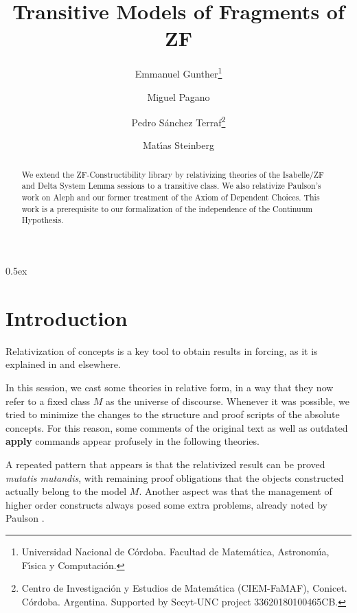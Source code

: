 \documentclass[11pt,a4paper,english]{article}
\begin{document}
\title{Transitive Models of Fragments of ZF}
\author{Emmanuel Gunther\thanks{Universidad Nacional de C\'ordoba.
    Facultad de Matem\'atica, Astronom\'{\i}a,  F\'{\i}sica y
    Computaci\'on.}
  \and
  Miguel Pagano\footnotemark[1]
  \and
  Pedro S\'anchez Terraf\footnotemark[1] \thanks{Centro de Investigaci\'on y Estudios de Matem\'atica
    (CIEM-FaMAF), Conicet. C\'ordoba. Argentina.
    Supported by Secyt-UNC project 33620180100465CB.}
  \and
  Mat\'{\i}as Steinberg\footnotemark[1]
}
\maketitle

\begin{abstract}
  We extend the ZF-Constructibility library by relativizing theories
  of the Isabelle/ZF and Delta System Lemma sessions to a transitive
  class. We also relativize Paulson's work on Aleph and our former
  treatment of the Axiom of Dependent Choices. This work is a
  prerequisite to our formalization of the independence of the
  Continuum Hypothesis.
\end{abstract}


\tableofcontents

\parindent 0pt\parskip 0.5ex

\section{Introduction}

Relativization of concepts is a key tool to obtain results in forcing,
as it is explained in \cite[Sect.~3]{2020arXiv200109715G} and elsewhere.

In this session, we cast some theories in relative form, in a
way that they now refer to a fixed class $M$ as the universe of
discourse. Whenever it was possible, we tried to minimize the changes
to the structure and proof scripts of the absolute concepts. For
this reason, some comments of the original text as well as
outdated \textbf{apply} commands appear profusely in the following
theories.

A repeated pattern that appears is that the relativized result can be
proved \emph{mutatis mutandis}, with remaining proof obligations that
the objects constructed actually belong to the model $M$. Another
aspect was that the management of higher order constructs always posed
some extra problems, already noted by Paulson \cite[Sect.~7.3]{MR2051585}.
\end{document}
